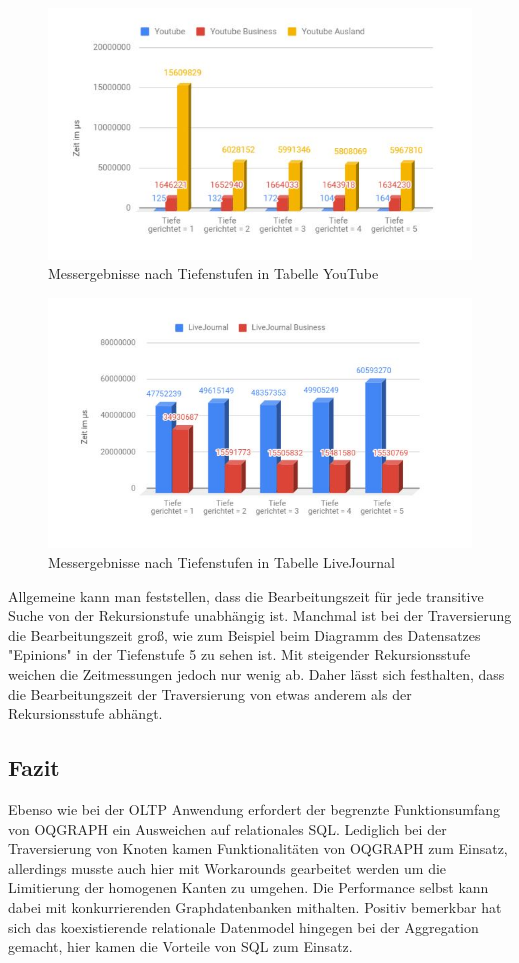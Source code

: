 \begin{figure}
	\centering
	\includegraphics[width=\textwidth]{images/youtub.jpg}
	\caption{Messergebnisse nach Tiefenstufen in Tabelle YouTube}
	\label{fig:youtub}
\end{figure}

\begin{figure}
	\centering
	\includegraphics[width=\textwidth]{images/LiJou.jpg}
	\caption{Messergebnisse nach Tiefenstufen in Tabelle LiveJournal}
	\label{fig:LiJou}
\end{figure}

Allgemeine kann man feststellen, dass die Bearbeitungszeit für jede transitive Suche von der Rekursionstufe unabhängig ist. Manchmal ist bei der Traversierung die Bearbeitungszeit groß,  wie zum Beispiel beim Diagramm des Datensatzes "Epinions" in der Tiefenstufe 5 zu sehen ist. Mit steigender Rekursionsstufe weichen die Zeitmessungen jedoch nur wenig ab. Daher lässt sich festhalten, dass die Bearbeitungszeit der Traversierung von etwas anderem als der Rekursionsstufe abhängt.

\subsection{Fazit}
Ebenso wie bei der OLTP Anwendung erfordert der begrenzte Funktionsumfang von OQGRAPH ein Ausweichen auf relationales SQL. Lediglich bei der Traversierung von Knoten kamen Funktionalitäten von OQGRAPH zum Einsatz, allerdings musste auch hier mit Workarounds gearbeitet werden um die Limitierung der homogenen Kanten zu umgehen. Die Performance selbst kann dabei mit konkurrierenden Graphdatenbanken mithalten. Positiv bemerkbar hat sich das koexistierende relationale Datenmodel hingegen bei der Aggregation gemacht, hier kamen die Vorteile von SQL zum Einsatz.
